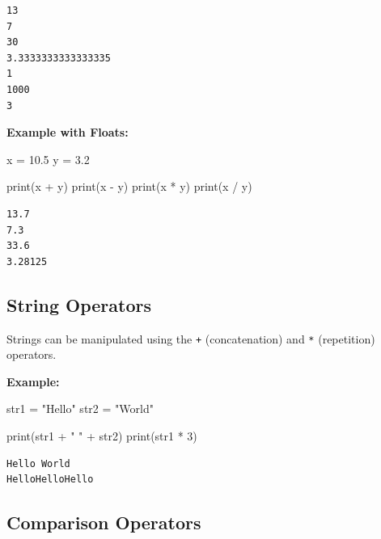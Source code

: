\documentclass[
  letterpaper,
  DIV=11,
  numbers=noendperiod]{scrreprt}
\newenvironment{Shaded}{\begin{snugshade}}{\end{snugshade}}
\newcommand{\BuiltInTok}[1]{\textcolor[rgb]{0.00,0.23,0.31}{#1}}
\newcommand{\DecValTok}[1]{\textcolor[rgb]{0.68,0.00,0.00}{#1}}
\newcommand{\FloatTok}[1]{\textcolor[rgb]{0.68,0.00,0.00}{#1}}
\newcommand{\NormalTok}[1]{\textcolor[rgb]{0.00,0.23,0.31}{#1}}
\newcommand{\OperatorTok}[1]{\textcolor[rgb]{0.37,0.37,0.37}{#1}}
\newcommand{\StringTok}[1]{\textcolor[rgb]{0.13,0.47,0.30}{#1}}
\begin{document}
\begin{verbatim}
13
7
30
3.3333333333333335
1
1000
3
\end{verbatim}

\textbf{Example with Floats:}

\begin{Shaded}
\begin{Highlighting}[]
\NormalTok{x }\OperatorTok{=} \FloatTok{10.5}
\NormalTok{y }\OperatorTok{=} \FloatTok{3.2}

\BuiltInTok{print}\NormalTok{(x }\OperatorTok{+}\NormalTok{ y)  }
\BuiltInTok{print}\NormalTok{(x }\OperatorTok{{-}}\NormalTok{ y)  }
\BuiltInTok{print}\NormalTok{(x }\OperatorTok{*}\NormalTok{ y)  }
\BuiltInTok{print}\NormalTok{(x }\OperatorTok{/}\NormalTok{ y)}
\end{Highlighting}
\end{Shaded}

\begin{verbatim}
13.7
7.3
33.6
3.28125
\end{verbatim}

\hypertarget{string-operators}{%
\subsection{String Operators}\label{string-operators}}

Strings can be manipulated using the \texttt{+} (concatenation) and
\texttt{*} (repetition) operators.

\textbf{Example:}

\begin{Shaded}
\begin{Highlighting}[]
\NormalTok{str1 }\OperatorTok{=} \StringTok{"Hello"}
\NormalTok{str2 }\OperatorTok{=} \StringTok{"World"}

\BuiltInTok{print}\NormalTok{(str1 }\OperatorTok{+} \StringTok{" "} \OperatorTok{+}\NormalTok{ str2)  }
\BuiltInTok{print}\NormalTok{(str1 }\OperatorTok{*} \DecValTok{3}\NormalTok{)  }
\end{Highlighting}
\end{Shaded}

\begin{verbatim}
Hello World
HelloHelloHello
\end{verbatim}

\hypertarget{comparison-operators}{%
\subsection{Comparison Operators}\label{comparison-operators}}
\end{document}

